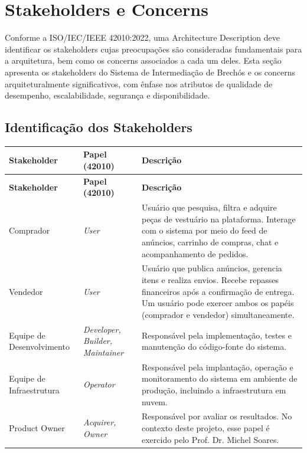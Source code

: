 ﻿\documentclass[12pt,a4paper]{article}
\begin{document}
\section{Stakeholders e Concerns}

Conforme a ISO/IEC/IEEE 42010:2022, uma Architecture Description deve identificar os stakeholders cujas preocupações são consideradas fundamentais para a arquitetura, bem como os concerns associados a cada um deles. Esta seção apresenta os stakeholders do Sistema de Intermediação de Brechós e os concerns arquiteturalmente significativos, com ênfase nos atributos de qualidade de desempenho, escalabilidade, segurança e disponibilidade.

\subsection{Identificação dos Stakeholders}

\begin{longtable}{|p{3.5cm}|p{3cm}|p{7.5cm}|}
\hline
\textbf{Stakeholder} & \textbf{Papel (42010)} & \textbf{Descrição} \\
\hline
\endfirsthead
\hline
\textbf{Stakeholder} & \textbf{Papel (42010)} & \textbf{Descrição} \\
\hline
\endhead
Comprador & \textit{User} & Usuário que pesquisa, filtra e adquire peças de vestuário na plataforma. Interage com o sistema por meio do feed de anúncios, carrinho de compras, chat e acompanhamento de pedidos. \\
\hline
Vendedor & \textit{User} & Usuário que publica anúncios, gerencia itens e realiza envios. Recebe repasses financeiros após a confirmação de entrega. Um usuário pode exercer ambos os papéis (comprador e vendedor) simultaneamente. \\
\hline
Equipe de Desenvolvimento & \textit{Developer, Builder, Maintainer} & Responsável pela implementação, testes e manutenção do código-fonte do sistema. \\
\hline
Equipe de Infraestrutura & \textit{Operator} & Responsável pela implantação, operação e monitoramento do sistema em ambiente de produção, incluindo a infraestrutura em nuvem. \\
\hline
Product Owner & \textit{Acquirer, Owner} & Responsável por avaliar os resultados. No contexto deste projeto, esse papel é exercido pelo Prof. Dr. Michel Soares. \\
\hline
\end{longtable}
\end{document}
